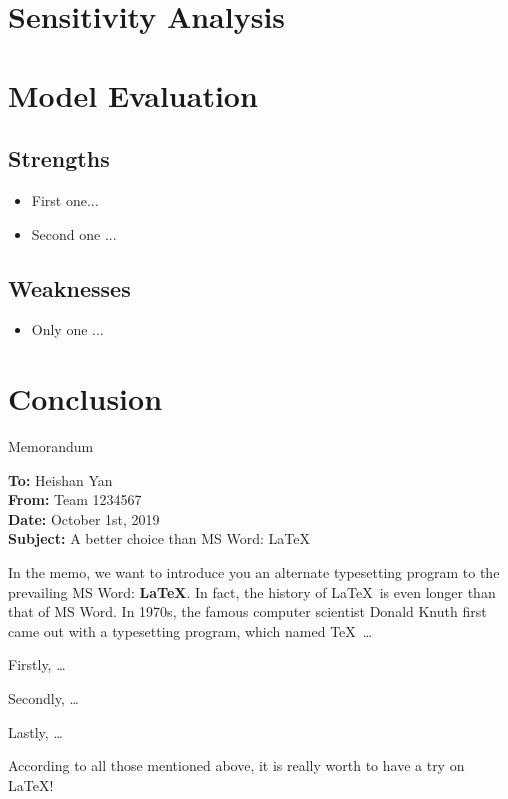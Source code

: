\documentclass[12pt]{article}  %
\begin{document}
\section{Sensitivity Analysis}

\section{Model Evaluation}
\subsection{Strengths}
\begin{itemize}
    \item First one...
    \item Second one ...
\end{itemize}

\subsection{Weaknesses}
\begin{itemize}
    \item Only one ...
 \end{itemize}
 
\section{Conclusion}

\begin{letter}{Memorandum}
\begin{flushleft}  %
\textbf{To:} Heishan Yan\\
\textbf{From:} Team 1234567\\
\textbf{Date:} October 1st, 2019\\
\textbf{Subject:} A better choice than MS Word: \LaTeX
\end{flushleft}

In the memo, we want to introduce you an alternate typesetting program to the prevailing MS Word: \textbf{\LaTeX}. In fact, the history of \LaTeX\ is even longer than that of MS Word. In 1970s, the famous computer scientist Donald Knuth first came out with a typesetting program, which named \TeX\ \ldots

Firstly, \ldots

Secondly, \ldots

Lastly, \ldots

According to all those mentioned above, it is really worth to have a try on \LaTeX! 
\end{letter}
\end{document}
